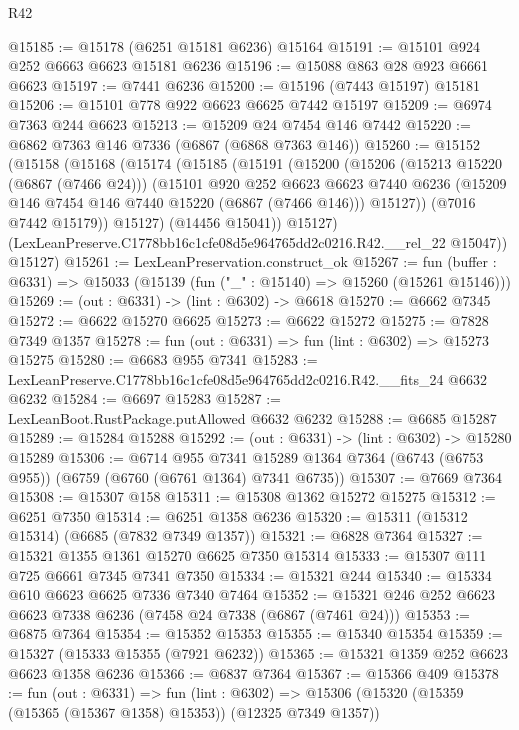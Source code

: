 \begin{lexlean}{R42}
\begin{coremodule}
{@15185 := @15178 (@6251 @15181 @6236) @15164
@15191 := @15101 @924 @252 @6663 @6623 @15181 @6236
@15196 := @15088 @863 @28 @923 @6661 @6623
@15197 := @7441 @6236
@15200 := @15196 (@7443 @15197) @15181
@15206 := @15101 @778 @922 @6623 @6625 @7442 @15197
@15209 := @6974 @7363 @244 @6623
@15213 := @15209 @24 @7454 @146 @7442
@15220 := @6862 @7363 @146 @7336 (@6867 (@6868 @7363 @146))
@15260 := @15152
    (@15158
      (@15168
        (@15174
          (@15185
            (@15191
              (@15200
                (@15206
                  (@15213 @15220 (@6867 (@7466 @24)))
                  (@15101
                    @920
                    @252
                    @6623
                    @6623
                    @7440
                    @6236
                    (@15209 @146 @7454 @146 @7440 @15220 (@6867 (@7466 @146)))
                    @15127))
                (@7016 @7442 @15179))
              @15127)
            (@14456 @15041))
          @15127)
        (LexLeanPreserve.C1778bb16c1cfe08d5e964765dd2c0216.R42.__rel_22 @15047))
      @15127)
@15261 := LexLeanPreservation.construct_ok
@15267 := fun (buffer : @6331) => @15033 (@15139 (fun ("_" : @15140) => @15260 (@15261 @15146)))
@15269 := (out : @6331) -> (lint : @6302) -> @6618
@15270 := @6662 @7345
@15272 := @6622 @15270 @6625
@15273 := @6622 @15272
@15275 := @7828 @7349 @1357
@15278 := fun (out : @6331) => fun (lint : @6302) => @15273 @15275
@15280 := @6683 @955 @7341
@15283 := LexLeanPreserve.C1778bb16c1cfe08d5e964765dd2c0216.R42.__fits_24 @6632 @6232
@15284 := @6697 @15283
@15287 := LexLeanBoot.RustPackage.putAllowed @6632 @6232
@15288 := @6685 @15287
@15289 := @15284 @15288
@15292 := (out : @6331) -> (lint : @6302) -> @15280 @15289
@15306 := @6714
    @955
    @7341
    @15289
    @1364
    @7364
    (@6743 (@6753 @955))
    (@6759 (@6760 (@6761 @1364) @7341 @6735))
@15307 := @7669 @7364
@15308 := @15307 @158
@15311 := @15308 @1362 @15272 @15275
@15312 := @6251 @7350
@15314 := @6251 @1358 @6236
@15320 := @15311 (@15312 @15314) (@6685 (@7832 @7349 @1357))
@15321 := @6828 @7364
@15327 := @15321 @1355 @1361 @15270 @6625 @7350 @15314
@15333 := @15307 @111 @725 @6661 @7345 @7341 @7350
@15334 := @15321 @244
@15340 := @15334 @610 @6623 @6625 @7336 @7340 @7464
@15352 := @15321 @246 @252 @6623 @6623 @7338 @6236 (@7458 @24 @7338 (@6867 (@7461 @24)))
@15353 := @6875 @7364
@15354 := @15352 @15353
@15355 := @15340 @15354
@15359 := @15327 (@15333 @15355 (@7921 @6232))
@15365 := @15321 @1359 @252 @6623 @6623 @1358 @6236
@15366 := @6837 @7364
@15367 := @15366 @409
@15378 := fun (out : @6331) =>
  fun (lint : @6302) => @15306 (@15320 (@15359 (@15365 (@15367 @1358) @15353)) (@12325 @7349 @1357))
}
\end{coremodule}
\end{lexlean}
